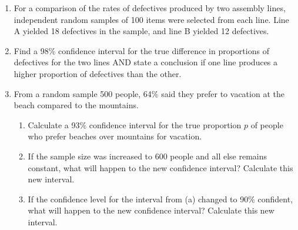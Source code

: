 \documentclass{article}
\begin{document}
\begin{enumerate}
    \item For a comparison of the rates of defectives produced by two assembly lines, independent random samples of 100 items were selected from each line. Line A yielded 18 defectives in the sample, and line B yielded 12 defectives.
    \item[] Find a 98\% confidence interval for the true difference in proportions of defectives for the two lines AND state a conclusion if one line produces a higher proportion of defectives than the other.\vspace{120pt}%
    
    \item From a random sample 500 people, 64\% said they prefer to vacation at the beach compared to the mountains.%
    \begin{enumerate}
        \item Calculate a 93\% confidence interval for the true proportion $p$ of people who prefer beaches over mountains for vacation.\vspace{70pt}
        \item If the sample size was increased to 600 people and all else remains constant, what will happen to the new confidence interval? Calculate this new interval.\vspace{70pt}
        \item If the confidence level for the interval from (a) changed to 90\% confident, what will happen to the new confidence interval? Calculate this new interval.\vspace{70pt}
    \end{enumerate}
        
\end{enumerate}
\end{document}
